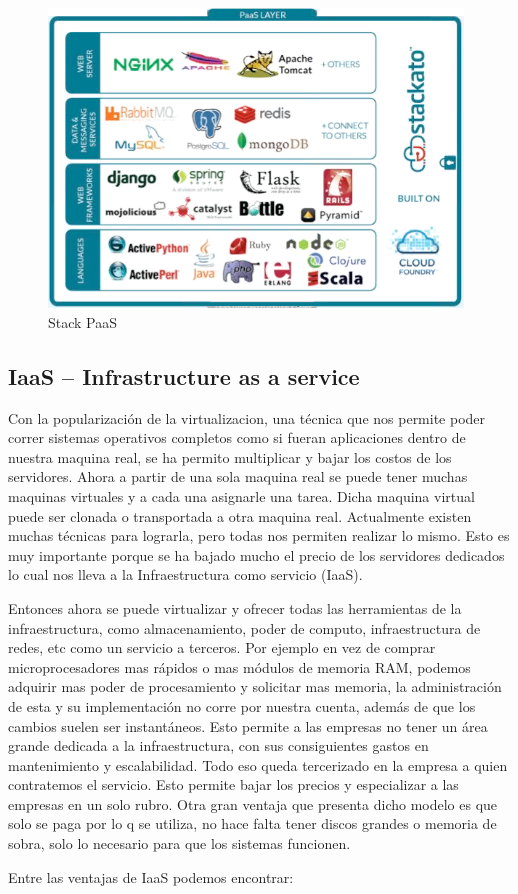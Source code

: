 \documentclass[12pt,a4paper]{article}
\begin{document}
\begin{figure}[h!]
 \centering
 \includegraphics[width=0.98\textwidth]{stackAto.png}
\caption[Stack PaaS]{Stack PaaS}
\end{figure}

\subsection{IaaS -- Infrastructure as a service}
Con la popularización de la virtualizacion, una técnica que nos permite poder correr sistemas 
operativos completos como si fueran aplicaciones dentro de nuestra maquina real, se ha permito
multiplicar y bajar los costos de los servidores. Ahora a partir de una sola maquina real se puede 
tener muchas maquinas virtuales y a cada una asignarle una tarea. Dicha maquina virtual puede ser 
clonada o transportada a otra maquina real. Actualmente existen muchas técnicas para lograrla, pero 
todas nos permiten realizar lo mismo. Esto es muy importante porque se ha bajado mucho el precio de 
los servidores dedicados lo cual nos lleva a la Infraestructura como servicio (IaaS).\par
Entonces ahora se puede virtualizar y ofrecer todas las herramientas de la infraestructura, como
almacenamiento, poder de computo, infraestructura de redes, etc como un servicio a terceros. Por 
ejemplo en vez de comprar microprocesadores mas rápidos o mas módulos de memoria RAM, podemos 
adquirir mas poder de procesamiento y solicitar mas memoria, la administración de esta y su 
implementación no corre por nuestra cuenta, además de que los cambios suelen ser instantáneos. Esto 
permite a las empresas no tener un área grande dedicada a la infraestructura, con sus consiguientes 
gastos en mantenimiento y escalabilidad. Todo eso queda tercerizado en la empresa a quien contratemos 
el servicio. Esto permite bajar los precios y especializar a las empresas en un solo rubro. Otra gran 
ventaja que presenta dicho modelo es que solo se paga por lo q se utiliza, no hace falta tener discos 
grandes o memoria de sobra, solo lo necesario para que los sistemas funcionen.\par
Entre las ventajas de IaaS podemos encontrar:\\
\end{document}
